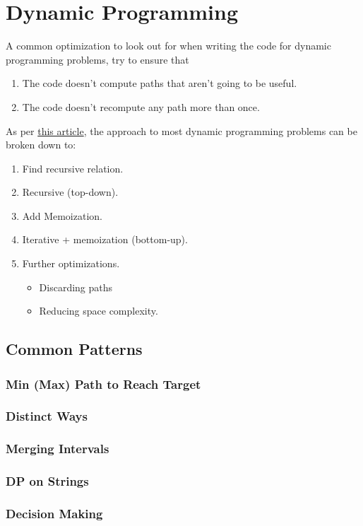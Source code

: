 \documentclass{report}
\begin{document}
\section{Dynamic Programming}
A common optimization to look out for when writing the code
for dynamic programming problems, try to ensure that
\begin{enumerate}
    \item The code doesn't compute paths that aren't going to be useful.
    \item The code doesn't recompute any path more than once.
\end{enumerate}
As per \href{https://leetcode.com/problems/house-robber/discuss/156523/From-good-to-great.-How-to-approach-most-of-DP-problems}{this article}, the approach to most dynamic programming problems can be broken
down to:
\begin{enumerate}
    \item Find recursive relation.
    \item Recursive (top-down).
    \item Add Memoization.
    \item Iterative + memoization (bottom-up).
    \item Further optimizations.
    \begin{itemize}
        \item Discarding paths
        \item Reducing space complexity.
    \end{itemize}
\end{enumerate}
\subsection{Common Patterns}
\subsubsection{Min (Max) Path to Reach Target}
\subsubsection{Distinct Ways}
\subsubsection{Merging Intervals}
\subsubsection{DP on Strings}
\subsubsection{Decision Making}
\end{document}
